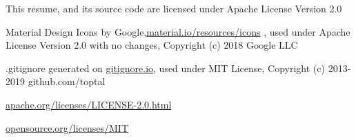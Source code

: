 \hspace{1pt}

\tiny{

This resume, and its source code are licensed under Apache License Version 2.0

Material Design Icons by Google,{\secondaryColor\href{https://material.io/resources/icons}{material.io/resources/icons} }, used under Apache License Version 2.0 with no changes, Copyright (c) 2018 Google LLC

.gitignore generated on {\secondaryColor\href{https://gitignore.io}{gitignore.io}}, used under MIT License, Copyright (c) 2013-2019 github.com/toptal

\secondaryColor\href{https://www.apache.org/licenses/LICENSE-2.0.html}{apache.org/licenses/LICENSE-2.0.html}

\secondaryColor\href{https://opensource.org/licenses/MIT}{opensource.org/licenses/MIT}


}